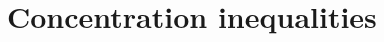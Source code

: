 \documentclass[11pt]{article}
\begin{document}
%
%
%

 


\section{Concentration inequalities}
\label{sec:Tools}
\end{document}
